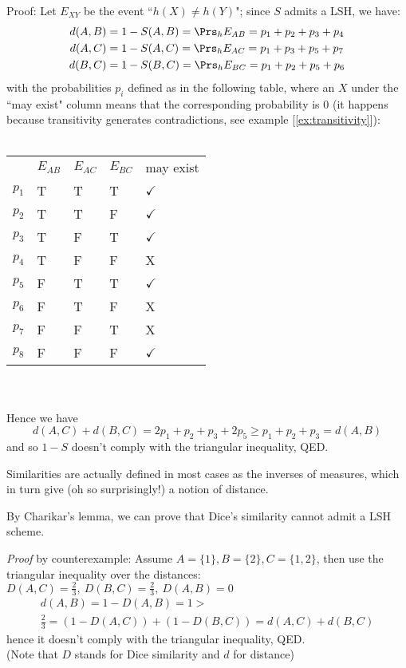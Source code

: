 	\newpage
	Proof: Let $E_{XY}$ be the event ``$h(X) \neq h(Y)$"; since $S$ admits a LSH, we have:
	\begin{align*}
		d(A,B) &= 1-S(A,B) = \Prs_h{E_{AB}} = p_1 + p_2 + p_3 + p_4 \\
		d(A,C) &= 1-S(A,C) = \Prs_h{E_{AC}} = p_1 + p_3 + p_5 + p_7 \\
		d(B,C) &= 1-S(B,C) = \Prs_h{E_{BC}} = p_1 + p_2 + p_5 + p_6
	\end{align*}
	with the probabilities $p_i$ defined as in the following table, where an $X$ under the ``may exist" column means that the corresponding probability is $0$ (it happens because transitivity generates contradictions, see example [\ref{ex:transitivity}]): \\\\
	\begin{tabular}{lllll}
		& $E_{AB}$ & $E_{AC}$ & $E_{BC}$ & may exist             \\
		$p_1$ & T         & T         & T         & $\checkmark$ \\
		$p_2$ & T         & T         & F         & $\checkmark$ \\
		$p_3$ & T         & F         & T         & $\checkmark$ \\
		$p_4$ & T         & F         & F         & X            \\
		$p_5$ & F         & T         & T         & $\checkmark$ \\
		$p_6$ & F         & T         & F         & X            \\
		$p_7$ & F         & F         & T         & X            \\
		$p_8$ & F         & F         & F         & $\checkmark$
	\end{tabular} \\\\
	Hence we have
	\begin{equation*}
		d(A,C) + d(B,C) = 2p_1 + p_2 + p_3 + 2p_5 \geq p_1 + p_2 + p_3 = d(A,B)
	\end{equation*}
	and so $1-S$ doesn't comply with the triangular inequality, QED.
	
	\obs Similarities are actually defined in most cases as the inverses of measures, which in turn give (oh so surprisingly!) a notion of distance.
	
	\cor By Charikar's lemma, we can prove that Dice's similarity cannot admit a LSH scheme.
	
	\textit{Proof} by counterexample: Assume $A=\{1\}, B=\{2\}, C=\{1, 2\}$, then use the triangular inequality over the distances: \\
	$D(A,C)=\frac{2}{3},\ D(B,C)=\frac{2}{3},\ D(A,B)=0$
	\begin{multline*}
		d(A,B) = 1- D(A,B) = 1 > \\
		\frac{2}{3} = (1-D(A,C)) + (1-D(B,C)) = d(A,C) + d(B,C)
	\end{multline*}
	hence it doesn't comply with the triangular inequality, QED.\\
	(Note that $D$ stands for Dice similarity and $d$ for distance)
	
